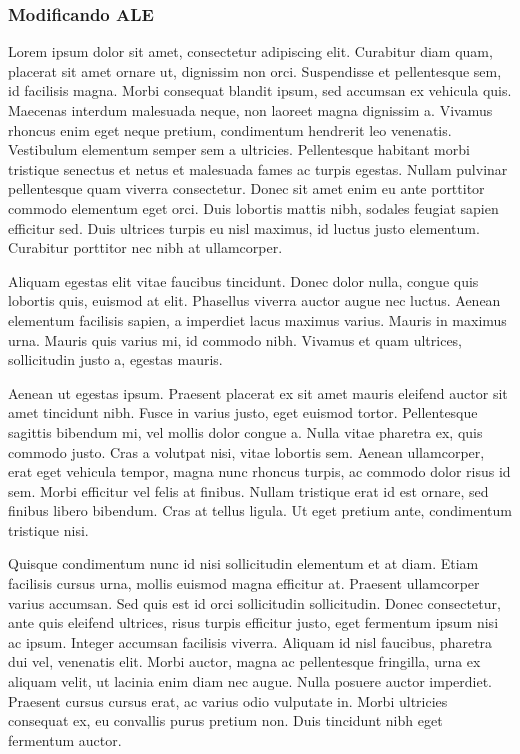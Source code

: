 \subsubsection{Modificando ALE}
\label{subsubsec:ramanalisi:modale}
Lorem ipsum dolor sit amet, consectetur adipiscing elit. Curabitur diam quam, placerat sit amet ornare ut, dignissim non orci. Suspendisse et pellentesque sem, id facilisis magna. Morbi consequat blandit ipsum, sed accumsan ex vehicula quis. Maecenas interdum malesuada neque, non laoreet magna dignissim a. Vivamus rhoncus enim eget neque pretium, condimentum hendrerit leo venenatis. Vestibulum elementum semper sem a ultricies. Pellentesque habitant morbi tristique senectus et netus et malesuada fames ac turpis egestas. Nullam pulvinar pellentesque quam viverra consectetur. Donec sit amet enim eu ante porttitor commodo elementum eget orci. Duis lobortis mattis nibh, sodales feugiat sapien efficitur sed. Duis ultrices turpis eu nisl maximus, id luctus justo elementum. Curabitur porttitor nec nibh at ullamcorper.

Aliquam egestas elit vitae faucibus tincidunt. Donec dolor nulla, congue quis lobortis quis, euismod at elit. Phasellus viverra auctor augue nec luctus. Aenean elementum facilisis sapien, a imperdiet lacus maximus varius. Mauris in maximus urna. Mauris quis varius mi, id commodo nibh. Vivamus et quam ultrices, sollicitudin justo a, egestas mauris.

Aenean ut egestas ipsum. Praesent placerat ex sit amet mauris eleifend auctor sit amet tincidunt nibh. Fusce in varius justo, eget euismod tortor. Pellentesque sagittis bibendum mi, vel mollis dolor congue a. Nulla vitae pharetra ex, quis commodo justo. Cras a volutpat nisi, vitae lobortis sem. Aenean ullamcorper, erat eget vehicula tempor, magna nunc rhoncus turpis, ac commodo dolor risus id sem. Morbi efficitur vel felis at finibus. Nullam tristique erat id est ornare, sed finibus libero bibendum. Cras at tellus ligula. Ut eget pretium ante, condimentum tristique nisi.

Quisque condimentum nunc id nisi sollicitudin elementum et at diam. Etiam facilisis cursus urna, mollis euismod magna efficitur at. Praesent ullamcorper varius accumsan. Sed quis est id orci sollicitudin sollicitudin. Donec consectetur, ante quis eleifend ultrices, risus turpis efficitur justo, eget fermentum ipsum nisi ac ipsum. Integer accumsan facilisis viverra. Aliquam id nisl faucibus, pharetra dui vel, venenatis elit. Morbi auctor, magna ac pellentesque fringilla, urna ex aliquam velit, ut lacinia enim diam nec augue. Nulla posuere auctor imperdiet. Praesent cursus cursus erat, ac varius odio vulputate in. Morbi ultricies consequat ex, eu convallis purus pretium non. Duis tincidunt nibh eget fermentum auctor.

